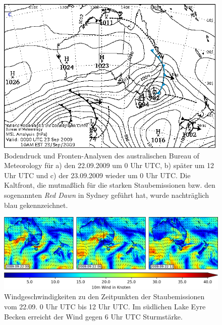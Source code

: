 \documentclass[12pt,a4paper,onecolumn]{scrartcl}
\begin{document}
\begin{figure}
\begin{minipage}[c]{0.33\textwidth}
	\end{minipage}\hfill
		\begin{minipage}[c]{0.33\textwidth}
		\includegraphics[width=\textwidth]{bilder/reddawn/2009092300.png}
	\end{minipage}\hfill
	\caption{Bodendruck und Fronten-Analysen des australischen Bureau of Meteorology für a) den 22.09.2009 um 0 Uhr UTC, b) später um 12 Uhr UTC und c) der 23.09.2009 wieder um 0 Uhr UTC. Die Kaltfront, die mutmaßlich für die starken Staubemissionen bzw. den sogenannten \textit{Red Dawn} in Sydney geführt hat, wurde nachträglich blau gekennzeichnet.} \label{fig:bom_analysis}
\end{figure}
\begin{figure}
\includegraphics[width=\textwidth]{bilder/reddawn/wind_reddawn_small.png}
\caption{Windgeschwindigkeiten zu den Zeitpunkten der Staubemissionen vom 22.09. 0 Uhr UTC bis 12 Uhr UTC. Im südlichen Lake Eyre Becken erreicht der Wind gegen 6 Uhr UTC Sturmstärke.} \label{fig:wind_reddawn}
\end{figure}
\end{document}
